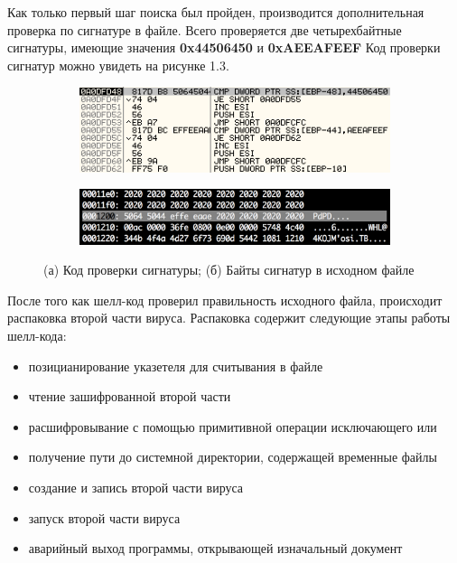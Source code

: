 Как только первый шаг поиска был пройден, производится дополнительная проверка по сигнатуре в файле.
Всего проверяется две четырехбайтные сигнатуры, имеющие значения \textbf{0x44506450} и \textbf{0xAEEAFEEF}
Код проверки сигнатур можно увидеть на рисунке 1.3.

\begin{figure}[ht]
    \centering
    \begin{subfigure}[h]{0.6\textwidth}
    \centering
        \includegraphics[scale=0.7]{1.pdf/pasted-image-25.png}
        \caption{}
        \vspace*{5mm}
    \end{subfigure}
    \begin{subfigure}[h]{0.6\textwidth}
    \centering
        \includegraphics[scale=0.7]{1.pdf/pasted-image-27.png}
        \caption{}
    \end{subfigure}
    \caption{(а) Код проверки сигнатуры; (б) Байты сигнатур в исходном файле}
    \label{fig_parsetree}
\end{figure}

После того как шелл-код проверил правильность исходного файла, происходит распаковка второй части вируса.
Распаковка содержит следующие этапы работы шелл-кода:
\begin{itemize}
\item позицианирование указетеля для считывания в файле
\item чтение зашифрованной второй части
\item расшифровывание с помощью примитивной операции исключающего или 
\item получение пути до системной директории, содержащей временные файлы
\item создание и запись второй части вируса
\item запуск второй части вируса
\item аварийный выход программы, открывающей изначальный документ
\end{itemize}


